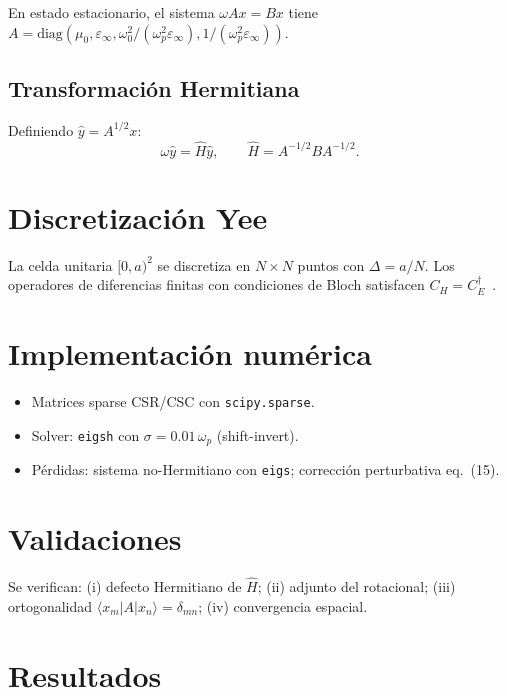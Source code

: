 \documentclass[12pt,a4paper]{article}
\begin{document}
En estado estacionario, el sistema $\omega A x = B x$ tiene
$A = \mathrm{diag}(\mu_0, \varepsilon_\infty, \omega_0^2/(\omega_p^2\varepsilon_\infty), 1/(\omega_p^2\varepsilon_\infty))$.

\subsection{Transformación Hermitiana}

Definiendo $\hat{y} = A^{1/2} x$:
\begin{equation}
  \omega \hat{y} = \hat{H}\hat{y}, \qquad
  \hat{H} = A^{-1/2} B A^{-1/2}.
\end{equation}

\section{Discretización Yee}

La celda unitaria $[0,a)^2$ se discretiza en $N\times N$ puntos con
$\Delta = a/N$. Los operadores de diferencias finitas con condiciones de
Bloch satisfacen $C_H = C_E^\dagger$~\cite{Yee1966,Taflove2005}.

\section{Implementación numérica}

\begin{itemize}
  \item Matrices sparse CSR/CSC con \texttt{scipy.sparse}.
  \item Solver: \texttt{eigsh} con $\sigma = 0.01\,\omega_p$ (shift-invert).
  \item Pérdidas: sistema no-Hermitiano con \texttt{eigs}; corrección
    perturbativa eq.~(15).
\end{itemize}

\section{Validaciones}

Se verifican: (i) defecto Hermitiano de $\hat{H}$; (ii) adjunto del
rotacional; (iii) ortogonalidad $\langle x_m|A|x_n\rangle = \delta_{mn}$;
(iv) convergencia espacial.

\section{Resultados}
\end{document}
